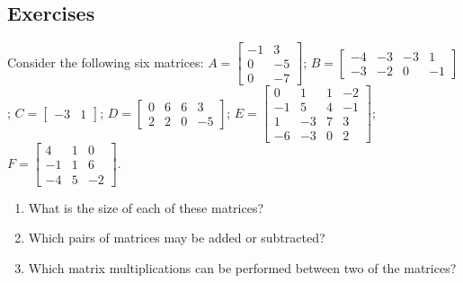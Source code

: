 \subsection{Exercises}


\begin{exercise} \label{ex:} 
Consider the following six matrices:
\(A=\begin{bmatrix} -1&3
\\0&-5
\\0&-7 \end{bmatrix}\);
\(B=\begin{bmatrix} -4&-3&-3&1
\\-3&-2&0&-1 \end{bmatrix}\);
\(C=\begin{bmatrix} -3&1 \end{bmatrix}\);
\(D=\begin{bmatrix} 0&6&6&3
\\2&2&0&-5 \end{bmatrix}\);
\(E=\begin{bmatrix} 0&1&1&-2
\\-1&5&4&-1
\\1&-3&7&3
\\-6&-3&0&2 \end{bmatrix}\);
\(F=\begin{bmatrix} 4&1&0
\\-1&1&6
\\-4&5&-2 \end{bmatrix}\).
\begin{enumerate}
\item What is the size of each of these matrices?

\item  Which pairs of matrices may be added or subtracted?

\item  Which matrix multiplications can be performed between two of the matrices?

\end{enumerate}
\end{exercise}





